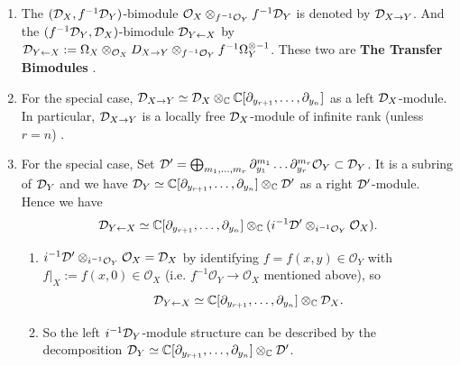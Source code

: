 \begin{remark}
    \begin{enumerate}
        \item The $(\mathcal{D}_X, f^{-1}\mathcal{D}_Y)$-bimodule $\mathcal{O}_X \otimes_{f^{-1}\mathcal{O}_Y} f^{-1}\mathcal{D}_Y$ is denoted by $\mathcal{D}_{X \to Y}$. And the $(f^{-1}\mathcal{D}_Y, \mathcal{D}_X)$-bimodule $\mathcal{D}_{Y \leftarrow X}$ by $\mathcal{D}_{Y \leftarrow X} := \Omega_X \otimes_{\mathcal{O}_X} D_{X \rightarrow Y} \otimes_{f^{-1}\mathcal{O}_Y} f^{-1}\Omega_Y^{\otimes -1}$. These two are \textbf{The Transfer Bimodules} \cite[Def~1.3.1., Def~1.3.3.]{hotta2008d}.
        \item For the special case, $\mathcal{D}_{X \to Y} \simeq \mathcal{D}_X \otimes_{\mathbb{C}} \mathbb{C}[\partial_{y_{r+1}}, \dots, \partial_{y_n}]$ as a left $\mathcal{D}_X$-module. In particular, $\mathcal{D}_{X \to Y}$ is a locally free $\mathcal{D}_X$-module of infinite rank (unless $r = n$) \cite[Ex.~1.3.2.]{hotta2008d}.
        \item \cite[Ex.~1.3.5.]{hotta2008d} For the special case, Set $\mathcal{D}' = \bigoplus_{m_1,\dots,m_r} \partial_{y_1}^{m_1} \dots \partial_{y_r}^{m_r} \mathcal{O}_Y \subset \mathcal{D}_Y$. It is a subring of $\mathcal{D}_Y$ and we have $\mathcal{D}_Y \simeq \mathbb{C}[\partial_{y_{r+1}}, \dots, \partial_{y_n}] \otimes_{\mathbb{C}} \mathcal{D}'$ as a right $\mathcal{D}'$-module. Hence we have
              $$\mathcal{D}_{Y \leftarrow X} \simeq \mathbb{C}[\partial_{y_{r+1}}, \dots, \partial_{y_n}] \otimes_{\mathbb{C}} (i^{-1}\mathcal{D}' \otimes_{i^{-1}\mathcal{O}_Y} \mathcal{O}_X). $$
              \begin{enumerate}
                  \item $i^{-1}\mathcal{D}' \otimes_{i^{-1}\mathcal{O}_Y} \mathcal{O}_X = \mathcal{D}_X$ by identifying $f = f(x,y) \in \mathcal{O}_Y$ with $f|_X := f(x,0) \in \mathcal{O}_X$ (i.e. $f^{-1}\mathcal{O}_Y\to \mathcal{O}_X$ mentioned above), so
                        $$\mathcal{D}_{Y \leftarrow X} \simeq \mathbb{C}[\partial_{y_{r+1}}, \dots, \partial_{y_n}] \otimes_{\mathbb{C}} \mathcal{D}_X.$$
                  \item So the left $i^{-1}\mathcal{D}_Y$-module structure can be described by the decomposition $\mathcal{D}_Y \simeq \mathbb{C}[\partial_{y_{r+1}}, \dots, \partial_{y_n}] \otimes_{\mathbb{C}} \mathcal{D}'$.
              \end{enumerate}


\end{enumerate}
\end{remark}

